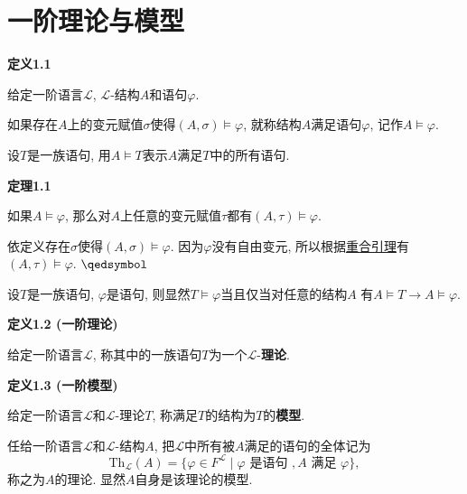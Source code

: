 \documentclass[UTF8]{ctexart}
\begin{document}
\setlength{\abovedisplayskip}{1pt}
\setlength{\belowdisplayskip}{1pt}

\section{一阶理论与模型}

\hypertarget{sec:定义1.1}{}
\noindent\textbf{定义1.1}

给定一阶语言$\mathcal{L}$, $\mathcal{L}$-结构$A$和语句$\varphi$.

如果存在$A$上的变元赋值$\sigma$使得$(A,\sigma)\models\varphi$,
就称结构$A$满足语句$\varphi$, 记作$A\models\varphi$.

\vspace{10pt}

设$T$是一族语句, 用$A\models T$表示$A$满足$T$中的所有语句.

\vspace{10pt}

\hypertarget{sec:定理1.1}{}
\noindent\textbf{定理1.1}

如果$A\models\varphi$, 那么对$A$上任意的变元赋值$\tau$都有$(A,\tau)\models\varphi$.


依定义存在$\sigma$使得$(A,\sigma)\models\varphi$. 因为$\varphi$没有自由变元,
所以根据\href{01 重合引理#nameddest=sec:定理1.2}{重合引理}有
$(A,\tau)\models\varphi$. \hfill $\qedsymbol$

\vspace{10pt}

设$T$是一族语句, $\varphi$是语句, 则显然$T\models\varphi$当且仅当对任意的结构$A$
有$A\models T\to A\models\varphi$.

\vspace{10pt}

\hypertarget{sec:定义1.2}{}
\noindent\textbf{定义1.2 (一阶理论)}

给定一阶语言$\mathcal{L}$, 称其中的一族语句$T$为一个$\mathcal{L}$-\textbf{理论}.

\vspace{10pt}

\hypertarget{sec:定义1.3}{}
\noindent\textbf{定义1.3 (一阶模型)}

给定一阶语言$\mathcal{L}$和$\mathcal{L}$-理论$T$, 称满足$T$的结构为$T$的\textbf{模型}.

\vspace{10pt}

任给一阶语言$\mathcal{L}$和$\mathcal{L}$-结构$A$,
把$\mathcal{L}$中所有被$A$满足的语句的全体记为
\[
    \mathrm{Th}_{\mathcal{L}}(A)=\{\varphi\in F^{\mathcal{L}}\mid
    \varphi\text{\ 是语句\ },A\text{\ 满足\ }\varphi\},
\]
称之为$A$的理论. 显然$A$自身是该理论的模型.
\end{document}
